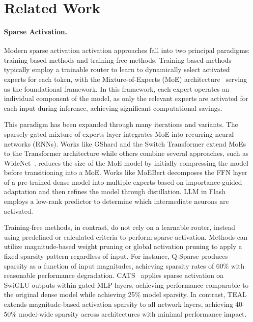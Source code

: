 \section{Related Work}
\label{sec:related_work}

\paragraph{Sparse Activation.} Modern sparse activation activation approaches fall into two principal paradigms: training-based methods and training-free methods. Training-based methods typically employ a trainable router to learn to dynamically select activated experts for each token, with the Mixture-of-Experts (MoE) architecture~\citep{jacobs1991adaptive} serving as the foundational framework. In this framework, each expert operates an individual component of the model, as only the relevant experts are activated for each input during inference, achieving significant computational savings.

This paradigm has been expanded through many iterations and variants. The sparsely-gated mixture of experts layer \citep{shazeer2017outrageously} integrates MoE into recurring neural networks (RNNs). Works like GShard \citep{lepikhin2020GShard} and the Switch Transformer \citep{fedus2022switch} extend MoEs to the Transformer architecture \citep{raffel2020exploring} while others combine several approaches, such as WideNet~\citep{xue2022go},  reduces the size of the MoE model by initially compressing the model before transitioning into a MoE. Works like MoEBert \citep{zuo2022moebert} decomposes the FFN layer of a pre-trained dense model into multiple experts based on importance-guided adaptation and then refines the model through distillation. LLM in Flash \citep{alizadeh2023llm} employs a low-rank predictor to determine which intermediate neurons are activated.

Training-free methods, in contrast, do not rely on a learnable router, instead using predefined or calculated criteria to perform sparse activation. Methods \citep{han2015learnweightsconnect} can utilize magnitude-based weight pruning or global activation pruning \citep{wen2016learnstructsparse} to apply a fixed sparsity pattern regardless of input. For instance, Q-Sparse \citep{wang2024q} produces sparsity as a function of input magnitudes, achieving sparsity rates of 60\% with reasonable performance degradation. CATS~\citep{lee2024catscontextuallyawarethresholdingsparsity} applies sparse activation on SwiGLU outputs within gated MLP layers, achieving performance comparable to the original dense model while achieving  25\% model sparsity. In contrast, TEAL~\citep{liu2024trainingfreeactivationsparsitylarge} extends magnitude-based activation sparsity to all network layers, achieving 40-50\% model-wide sparsity across architectures with minimal performance impact. 

